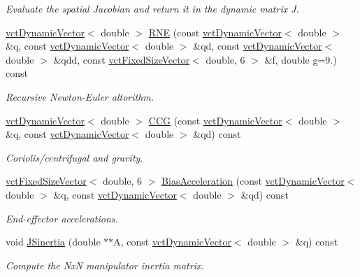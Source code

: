 \begin{DoxyCompactItemize}
\begin{DoxyCompactList}\small\item\em Evaluate the spatial Jacobian and return it in the dynamic matrix J. \end{DoxyCompactList}\item 
\hyperlink{classvct_dynamic_vector}{vct\-Dynamic\-Vector}$<$ double $>$ \hyperlink{classrob_manipulator_a3994fc004c5387ad68f3112aab37b907}{R\-N\-E} (const \hyperlink{classvct_dynamic_vector}{vct\-Dynamic\-Vector}$<$ double $>$ \&q, const \hyperlink{classvct_dynamic_vector}{vct\-Dynamic\-Vector}$<$ double $>$ \&qd, const \hyperlink{classvct_dynamic_vector}{vct\-Dynamic\-Vector}$<$ double $>$ \&qdd, const \hyperlink{classvct_fixed_size_vector}{vct\-Fixed\-Size\-Vector}$<$ double, 6 $>$ \&f, double g=9.) const 
\begin{DoxyCompactList}\small\item\em Recursive Newton-\/\-Euler altorithm. \end{DoxyCompactList}\item 
\hyperlink{classvct_dynamic_vector}{vct\-Dynamic\-Vector}$<$ double $>$ \hyperlink{classrob_manipulator_a2bab22615d2306c98984a3e2ef1dc729}{C\-C\-G} (const \hyperlink{classvct_dynamic_vector}{vct\-Dynamic\-Vector}$<$ double $>$ \&q, const \hyperlink{classvct_dynamic_vector}{vct\-Dynamic\-Vector}$<$ double $>$ \&qd) const 
\begin{DoxyCompactList}\small\item\em Coriolis/centrifugal and gravity. \end{DoxyCompactList}\item 
\hyperlink{classvct_fixed_size_vector}{vct\-Fixed\-Size\-Vector}$<$ double, 6 $>$ \hyperlink{classrob_manipulator_abd760ec964b192696e621ee58618098e}{Bias\-Acceleration} (const \hyperlink{classvct_dynamic_vector}{vct\-Dynamic\-Vector}$<$ double $>$ \&q, const \hyperlink{classvct_dynamic_vector}{vct\-Dynamic\-Vector}$<$ double $>$ \&qd) const 
\begin{DoxyCompactList}\small\item\em End-\/effector accelerations. \end{DoxyCompactList}\item 
void \hyperlink{classrob_manipulator_a98c6df79e3838790007a0de10a1a453a}{J\-Sinertia} (double $\ast$$\ast$A, const \hyperlink{classvct_dynamic_vector}{vct\-Dynamic\-Vector}$<$ double $>$ \&q) const 
\begin{DoxyCompactList}\small\item\em Compute the Nx\-N manipulator inertia matrix. \end{DoxyCompactList}\item 
$$
\end{DoxyCompactItemize}
